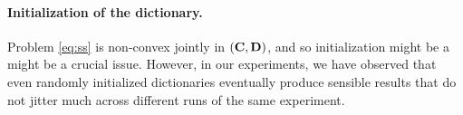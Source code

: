 

\paragraph{Initialization of the dictionary.}
Problem \eqref{eq:ss} is non-convex jointly in  $(\mathbf{C}, \mathbf{D})$, and so initialization might be a might be a crucial issue. However, in our experiments, we have observed that even randomly initialized dictionaries eventually produce sensible results that do not jitter much across different runs of the same experiment. %



